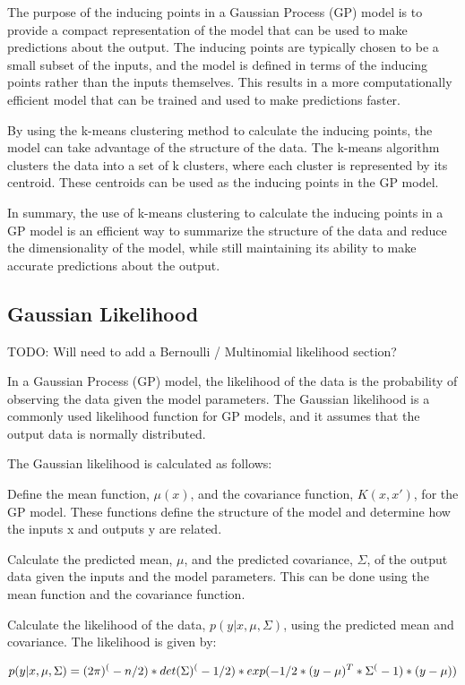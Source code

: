 \documentclass[12pt,a4paper]{report}
\begin{document}
The purpose of the inducing points in a Gaussian Process (GP) model is to provide a compact representation of the model that can be used to make predictions about the output. 
The inducing points are typically chosen to be a small subset of the inputs, and the model is defined in terms of the inducing points rather than the inputs themselves. 
This results in a more computationally efficient model that can be trained and used to make predictions faster.

By using the k-means clustering method to calculate the inducing points, the model can take advantage of the structure of the data. 
The k-means algorithm clusters the data into a set of k clusters, where each cluster is represented by its centroid. 
These centroids can be used as the inducing points in the GP model.

In summary, the use of k-means clustering to calculate the inducing points in a GP model is an efficient way to summarize the structure of the data and reduce the dimensionality of the model, while still maintaining its ability to make accurate predictions about the output.

\subsection{Gaussian Likelihood}

TODO: Will need to add a Bernoulli / Multinomial likelihood section?

In a Gaussian Process (GP) model, the likelihood of the data is the probability of observing the data given the model parameters. 
The Gaussian likelihood is a commonly used likelihood function for GP models, and it assumes that the output data is normally distributed.

The Gaussian likelihood is calculated as follows:

Define the mean function, $\mu(x)$, and the covariance function, $K(x, x')$, for the GP model. 
These functions define the structure of the model and determine how the inputs x and outputs y are related.

Calculate the predicted mean, $\mu$, and the predicted covariance, $\Sigma$, of the output data given the inputs and the model parameters. 
This can be done using the mean function and the covariance function.

Calculate the likelihood of the data, $p(y|x, \mu, \Sigma)$, using the predicted mean and covariance. 
The likelihood is given by:

\begin{equation}
    \centering
    p(y|x, \mu, \Sigma) = (2\pi)^(-n/2) * det(\Sigma)^(-1/2) * exp(-1/2 * (y - \mu)^T * \Sigma^(-1) * (y - \mu))
\end{equation}
\end{document}

